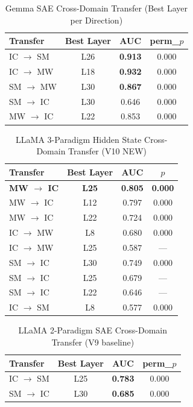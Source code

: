 \documentclass[11pt,a4paper]{article}
\begin{document}
\begin{table}[H]
\centering
\caption{Gemma SAE Cross-Domain Transfer (Best Layer per Direction)}\label{tab:t7}
\footnotesize
\begin{tabular}{lccc}
\toprule
Transfer & Best Layer & AUC & perm\_$p$ \\
\midrule
IC $\rightarrow$ SM & L26 & \textbf{0.913} & 0.000 \\
IC $\rightarrow$ MW & L18 & \textbf{0.932} & 0.000 \\
SM $\rightarrow$ MW & L30 & \textbf{0.867} & 0.000 \\
SM $\rightarrow$ IC & L30 & 0.646 & 0.000 \\
MW $\rightarrow$ IC & L22 & 0.853 & 0.000 \\
\bottomrule
\end{tabular}
\end{table}

\begin{table}[H]
\centering
\caption{LLaMA 3-Paradigm Hidden State Cross-Domain Transfer (V10 NEW)}\label{tab:t8}
\footnotesize
\begin{tabular}{lccc}
\toprule
Transfer & Best Layer & AUC & $p$ \\
\midrule
\textbf{MW $\rightarrow$ IC} & \textbf{L25} & \textbf{0.805} & \textbf{0.000} \\
MW $\rightarrow$ IC & L12 & 0.797 & 0.000 \\
MW $\rightarrow$ IC & L22 & 0.724 & 0.000 \\
IC $\rightarrow$ MW & L8 & 0.680 & 0.000 \\
IC $\rightarrow$ MW & L25 & 0.587 & --- \\
SM $\rightarrow$ IC & L30 & 0.749 & 0.000 \\
SM $\rightarrow$ IC & L25 & 0.679 & --- \\
SM $\rightarrow$ IC & L22 & 0.646 & --- \\
IC $\rightarrow$ SM & L8 & 0.577 & 0.000 \\
\bottomrule
\end{tabular}
\end{table}

\begin{table}[H]
\centering
\caption{LLaMA 2-Paradigm SAE Cross-Domain Transfer (V9 baseline)}\label{tab:t9}
\footnotesize
\begin{tabular}{lccc}
\toprule
Transfer & Best Layer & AUC & perm\_$p$ \\
\midrule
IC $\rightarrow$ SM & L25 & \textbf{0.783} & 0.000 \\
SM $\rightarrow$ IC & L30 & \textbf{0.685} & 0.000 \\
\bottomrule
\end{tabular}
\end{table}
\end{document}

